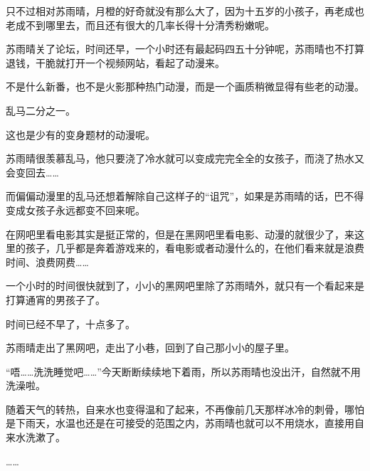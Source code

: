 只不过相对苏雨晴，月橙的好奇就没有那么大了，因为十五岁的小孩子，再老成也老成不到哪里去，而且还有很大的几率长得十分清秀粉嫩呢。

苏雨晴关了论坛，时间还早，一个小时还有最起码四五十分钟呢，苏雨晴也不打算退钱，干脆就打开一个视频网站，看起了动漫来。

不是什么新番，也不是火影那种热门动漫，而是一个画质稍微显得有些老的动漫。

乱马二分之一。

这也是少有的变身题材的动漫呢。

苏雨晴很羡慕乱马，他只要浇了冷水就可以变成完完全全的女孩子，而浇了热水又会变回去……

而偏偏动漫里的乱马还想着解除自己这样子的“诅咒”，如果是苏雨晴的话，巴不得变成女孩子永远都变不回来呢。

在网吧里看电影其实是挺正常的，但是在黑网吧里看电影、动漫的就很少了，来这里的孩子，几乎都是奔着游戏来的，看电影或者动漫什么的，在他们看来就是浪费时间、浪费网费……

一个小时的时间很快就到了，小小的黑网吧里除了苏雨晴外，就只有一个看起来是打算通宵的男孩子了。

时间已经不早了，十点多了。

苏雨晴走出了黑网吧，走出了小巷，回到了自己那小小的屋子里。

“唔……洗洗睡觉吧……”今天断断续续地下着雨，所以苏雨晴也没出汗，自然就不用洗澡啦。

随着天气的转热，自来水也变得温和了起来，不再像前几天那样冰冷的刺骨，哪怕是下雨天，水温也还是在可接受的范围之内，苏雨晴也就可以不用烧水，直接用自来水洗漱了。

……
